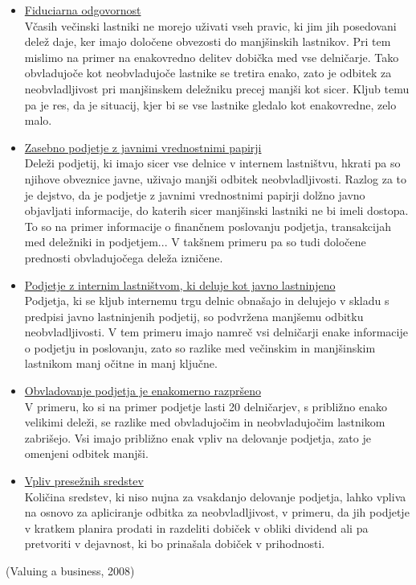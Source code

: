\documentclass[12pt,a4paper]{amsart}
\theoremstyle{definition} %
\theoremstyle{plain} %
\begin{document}
\begin{itemize}
\item\underline{Fiduciarna odgovornost}\\
Včasih večinski lastniki ne morejo uživati vseh pravic, ki jim jih posedovani delež daje, ker imajo določene obvezosti do manjšinskih lastnikov. Pri tem mislimo na primer na enakovredno delitev dobička med vse delničarje. Tako obvladujoče kot neobvladujoče lastnike se tretira enako, zato je odbitek za neobvladljivost pri manjšinskem deležniku precej manjši kot sicer. Kljub temu pa je res, da je situacij, kjer bi se vse lastnike gledalo kot enakovredne, zelo malo.
\item\underline{Zasebno podjetje z javnimi vrednostnimi papirji}\\
Deleži podjetij, ki imajo sicer vse delnice v internem lastništvu, hkrati pa so njihove obveznice javne, uživajo manjši odbitek neobvladljivosti. Razlog za to je dejstvo, da je podjetje z javnimi vrednostnimi papirji dolžno javno objavljati informacije, do katerih sicer manjšinski lastniki ne bi imeli dostopa. To so na primer informacije o finančnem poslovanju podjetja, transakcijah med deležniki in podjetjem... V takšnem primeru pa so tudi določene prednosti obvladujočega deleža izničene.
\item\underline{Podjetje z internim lastništvom, ki deluje kot javno lastninjeno}\\
Podjetja, ki se kljub internemu trgu delnic obnašajo in delujejo v skladu s predpisi javno lastninjenih podjetij, so podvržena manjšemu odbitku neobvladljivosti. V tem primeru imajo namreč vsi delničarji enake informacije o podjetju in poslovanju, zato so razlike med večinskim in manjšinskim lastnikom manj očitne in manj ključne.
\item\underline{ Obvladovanje podjetja je enakomerno razpršeno}\\
V primeru, ko si na primer podjetje lasti 20 delničarjev, s približno enako velikimi deleži, se razlike med obvladujočim in neobvladujočim lastnikom zabrišejo. Vsi imajo približno enak vpliv na delovanje podjetja, zato je omenjeni odbitek manjši.
\item\underline{Vpliv presežnih sredstev}\\
Količina sredstev, ki niso nujna za vsakdanjo delovanje podjetja, lahko vpliva na osnovo za apliciranje odbitka za neobvladljivost, v primeru, da jih podjetje v kratkem planira prodati in razdeliti dobiček v obliki dividend ali pa pretvoriti v dejavnost, ki bo prinašala dobiček v prihodnosti.
\end{itemize}
(Valuing a business, 2008)\\
\end{document}
